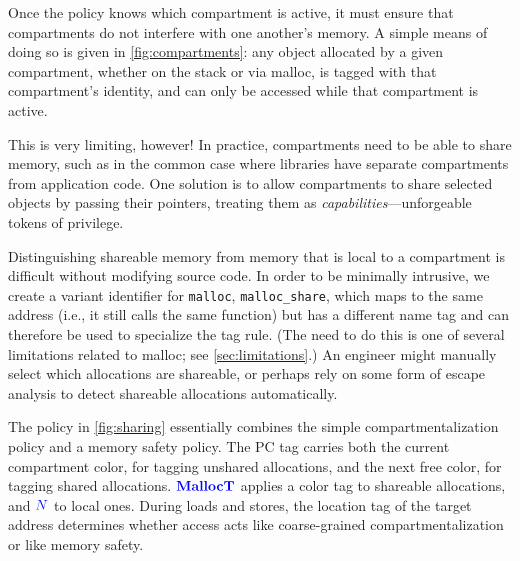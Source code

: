 \documentclass{llncs}
\begin{document}
Once the policy knows which compartment is active, it must ensure that compartments do not interfere with
one another's memory. A simple means of doing so is given in \cref{fig:compartments}: any object allocated by
a given compartment, whether on the stack or via malloc, is tagged with that compartment's identity,
and can only be accessed while that compartment is active.

This is very limiting, however! In practice, compartments need to be able to share memory, such as in the
common case where libraries have separate compartments from application code. One solution is to allow
compartments to share selected objects by passing their pointers, treating them as
{\em capabilities}---unforgeable tokens of privilege.

Distinguishing shareable memory from memory that is local to a compartment is difficult
without modifying source code. In order to be minimally intrusive, we
create a variant identifier for {\tt malloc}, {\tt malloc\_share}, which maps to the same
address (i.e., it still calls the same function) but has a different name tag and can therefore
be used to specialize the tag rule. (The need to do this is one of several limitations related
to malloc; see \cref{sec:limitations}.) An engineer might manually select which allocations are
shareable, or perhaps rely on some form of escape analysis to detect shareable allocations automatically.

The policy in \cref{fig:sharing} essentially combines the simple compartmentalization policy
and a memory safety policy. The PC tag carries both the current compartment color, for tagging
unshared allocations, and the next free color, for tagging shared allocations.
\(\color{blue} \mathbf{MallocT}\) applies a color tag to shareable allocations, and \({\color{blue} N}\) to local ones.
During loads and stores, the location tag of the target address
determines whether access acts like coarse-grained compartmentalization or like memory safety.
\end{document}
